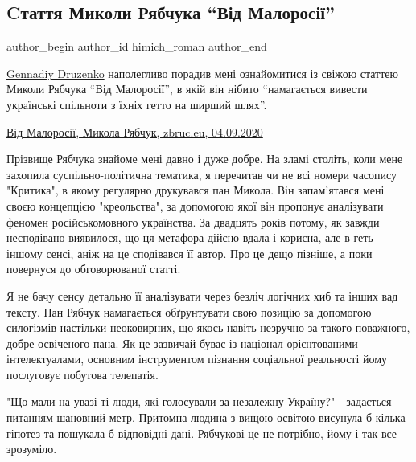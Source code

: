  
 
 
 
 
 
\subsection{Cтаття Миколи Рябчука \enquote{Від Малоросії}}
\label{sec:10_09_2020.fb.himich_roman.1.rjabchuk_statja_malorossia}
 
\ifcmt
 author_begin
   author_id himich_roman
 author_end
\fi

\href{https://www.facebook.com/gennadiy.druzenko}{Gennadiy Druzenko}
наполегливо порадив мені ознайомитися із свіжою статтею Миколи Рябчука \enquote{Від
Малоросії}, в якій він нібито \enquote{намагається вивести українські спільноти з їхніх
гетто на ширший шлях}.

\href{https://zbruc.eu/node/100091}{%
Від Малоросії, Микола Рябчук, zbruc.eu, 04.09.2020%
}

Прізвище Рябчука знайоме мені давно і дуже добре. На зламі століть, коли мене
захопила суспільно-політична тематика, я перечитав чи не всі номери часопису
"Критика", в якому регулярно друкувався пан Микола. Він запам'ятався мені своєю
концепцією "креольства", за допомогою якої він пропонує аналізувати феномен
російськомовного українства. За двадцять років потому, як завжди несподівано
виявилося, що ця метафора дійсно вдала і корисна, але в геть іншому сенсі, аніж
на це сподівався її автор. Про це дещо пізніше, а поки повернуся до
обговорюваної статті. 

Я не бачу сенсу детально її аналізувати через безліч логічних хиб та інших вад
тексту. Пан Рябчук намагається обґрунтувати свою позицію за допомогою
силогізмів настільки неоковирних, що якось навіть незручно за такого поважного,
добре освіченого пана. Як це зазвичай буває із націонал-орієнтованими
інтелектуалами, основним інструментом пізнання соціальної реальності йому
послуговує побутова телепатія. 

"Що мали на увазі ті люди, які голосували за незалежну Україну?" - задається
питанням шановний метр. Притомна людина з вищою освітою висунула б кілька
гіпотез та пошукала б відповідні дані. Рябчукові це не потрібно, йому і так все
зрозуміло. 

